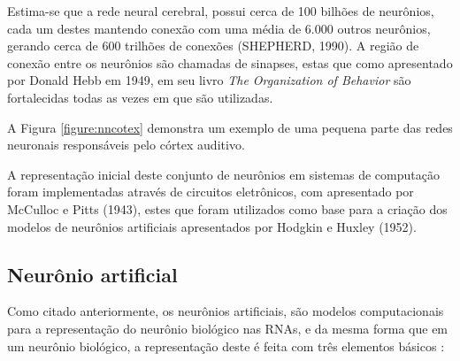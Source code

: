 
\par Estima-se que a rede neural cerebral, possui cerca de 100 bilhões de neurônios, cada um destes mantendo conexão com uma média de 6.000 outros neurônios, gerando cerca de 600 trilhões de conexões (SHEPHERD, 1990). A região de conexão entre os neurônios são chamadas de sinapses, estas que como apresentado por Donald Hebb em 1949, em seu livro \textit{The Organization of Behavior} são fortalecidas todas as vezes em que são utilizadas.


\par A Figura \ref{figure:nncotex} demonstra um exemplo de uma pequena parte das redes neuronais responsáveis pelo córtex auditivo.



\par A representação inicial deste conjunto de neurônios em sistemas de computação foram implementadas através de circuitos eletrônicos, com apresentado por McCulloc e Pitts (1943), estes que foram utilizados como base para a criação dos modelos de neurônios artificiais apresentados por Hodgkin e Huxley (1952).

\subsection{Neurônio artificial}

\par Como citado anteriormente, os neurônios artificiais, são modelos computacionais para a representação do neurônio biológico nas RNAs, e da mesma forma que em um neurônio biológico, a representação deste é feita com três elementos básicos \cite{Haykin2001}:  

